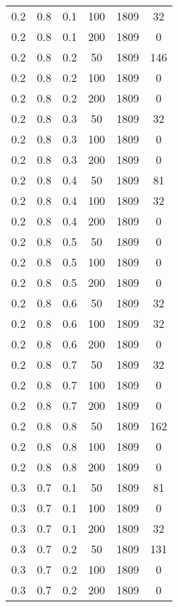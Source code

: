 \begin{center}
\begin{longtable}[c]{|c|c|c|c|c|c|}
		0.2 &  0.8 &  0.1 &  100 &  1809 &    32 \\
		0.2 &  0.8 &  0.1 &  200 &  1809 &     0 \\
	   \hline
		0.2 &  0.8 &  0.2 &   50 &  1809 &   146 \\
		0.2 &  0.8 &  0.2 &  100 &  1809 &     0 \\
		0.2 &  0.8 &  0.2 &  200 &  1809 &     0 \\
	   \hline
		0.2 &  0.8 &  0.3 &   50 &  1809 &    32 \\
		0.2 &  0.8 &  0.3 &  100 &  1809 &     0 \\
		0.2 &  0.8 &  0.3 &  200 &  1809 &     0 \\
	   \hline
		0.2 &  0.8 &  0.4 &   50 &  1809 &    81 \\
		0.2 &  0.8 &  0.4 &  100 &  1809 &    32 \\
		0.2 &  0.8 &  0.4 &  200 &  1809 &     0 \\
	   \hline
		0.2 &  0.8 &  0.5 &   50 &  1809 &     0 \\
		0.2 &  0.8 &  0.5 &  100 &  1809 &     0 \\
		0.2 &  0.8 &  0.5 &  200 &  1809 &     0 \\
	   \hline
		0.2 &  0.8 &  0.6 &   50 &  1809 &    32 \\
		0.2 &  0.8 &  0.6 &  100 &  1809 &    32 \\
		0.2 &  0.8 &  0.6 &  200 &  1809 &     0 \\
	   \hline
		0.2 &  0.8 &  0.7 &   50 &  1809 &    32 \\
		0.2 &  0.8 &  0.7 &  100 &  1809 &     0 \\
		0.2 &  0.8 &  0.7 &  200 &  1809 &     0 \\
	   \hline
		0.2 &  0.8 &  0.8 &   50 &  1809 &   162 \\
		0.2 &  0.8 &  0.8 &  100 &  1809 &     0 \\
		0.2 &  0.8 &  0.8 &  200 &  1809 &     0 \\
	   \hline
		0.3 &  0.7 &  0.1 &   50 &  1809 &    81 \\
		0.3 &  0.7 &  0.1 &  100 &  1809 &     0 \\
		0.3 &  0.7 &  0.1 &  200 &  1809 &    32 \\
	   \hline
		0.3 &  0.7 &  0.2 &   50 &  1809 &   131 \\
		0.3 &  0.7 &  0.2 &  100 &  1809 &     0 \\
		0.3 &  0.7 &  0.2 &  200 &  1809 &     0 \\
	   \hline

\end{longtable}
\end{center}
